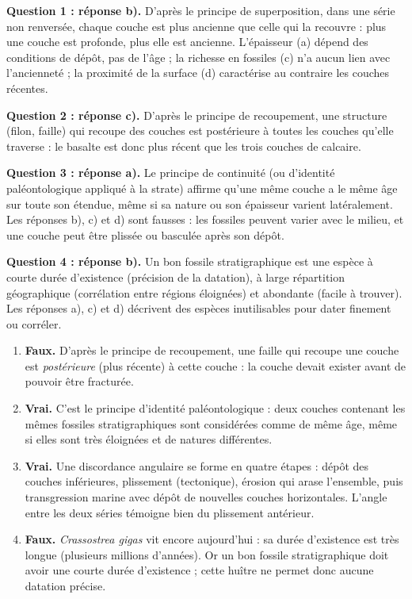 \documentclass[11pt]{article}
\newcommand{\cle}[1]{{\popxbold\color{popdark}#1}}
\begin{document}
\begin{corrige}

\textbf{Question 1 : réponse b).} D'après le \cle{principe de superposition}, dans une série non renversée, chaque couche est plus ancienne que celle qui la recouvre : plus une couche est profonde, plus elle est ancienne. L'épaisseur (a) dépend des conditions de dépôt, pas de l'âge ; la richesse en fossiles (c) n'a aucun lien avec l'ancienneté ; la proximité de la surface (d) caractérise au contraire les couches récentes.

\textbf{Question 2 : réponse c).} D'après le \cle{principe de recoupement}, une structure (filon, faille) qui recoupe des couches est postérieure à toutes les couches qu'elle traverse : le basalte est donc plus récent que les trois couches de calcaire.

\textbf{Question 3 : réponse a).} Le \cle{principe de continuité} (ou d'identité paléontologique appliqué à la strate) affirme qu'une même couche a le même âge sur toute son étendue, même si sa nature ou son épaisseur varient latéralement. Les réponses b), c) et d) sont fausses : les fossiles peuvent varier avec le milieu, et une couche peut être plissée ou basculée après son dépôt.

\textbf{Question 4 : réponse b).} Un bon \cle{fossile stratigraphique} est une espèce à \cle{courte durée d'existence} (précision de la datation), à \cle{large répartition géographique} (corrélation entre régions éloignées) et \cle{abondante} (facile à trouver). Les réponses a), c) et d) décrivent des espèces inutilisables pour dater finement ou corréler.
\end{corrige}

\begin{corrige}

\begin{enumerate}
\item \textbf{Faux.} D'après le principe de recoupement, une faille qui recoupe une couche est \emph{postérieure} (plus récente) à cette couche : la couche devait exister avant de pouvoir être fracturée.
\item \textbf{Vrai.} C'est le \cle{principe d'identité paléontologique} : deux couches contenant les mêmes fossiles stratigraphiques sont considérées comme de même âge, même si elles sont très éloignées et de natures différentes.
\item \textbf{Vrai.} Une \cle{discordance angulaire} se forme en quatre étapes : dépôt des couches inférieures, plissement (tectonique), érosion qui arase l'ensemble, puis transgression marine avec dépôt de nouvelles couches horizontales. L'angle entre les deux séries témoigne bien du plissement antérieur.
\item \textbf{Faux.} \emph{Crassostrea gigas} vit encore aujourd'hui : sa durée d'existence est très longue (plusieurs millions d'années). Or un bon fossile stratigraphique doit avoir une courte durée d'existence ; cette huître ne permet donc aucune datation précise.
\end{enumerate}
\end{corrige}
\end{document}
